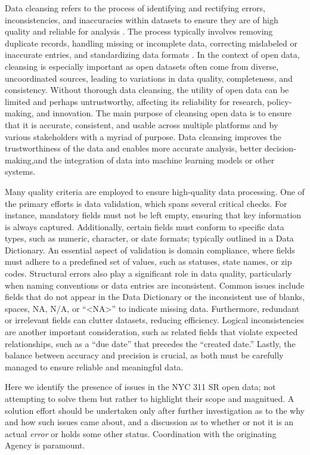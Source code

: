 \documentclass[linenumber]{jdsart}
\begin{document}
Data cleansing refers to the process of identifying and rectifying
errors, inconsistencies, and inaccuracies within datasets to ensure
they are of high quality and reliable for analysis
\citep{maletic2005data, hosseinzadeh2023data}. The process
typically involves removing duplicate records, handling missing or
incomplete data, correcting mislabeled or inaccurate entries, and
standardizing data formats \citep[e.g.,][]{cody2017cody,
  van2018statistical}. In the context of open data, cleansing is
especially important as open datasets often come from diverse,
uncoordinated sources, leading to variations in data quality,
completeness, and consistency. Without thorough data cleansing, the utility
of open data can be limited and perhaps untrustworthy, affecting 
its reliability for research, policy-making, and innovation. The 
main purpose of cleansing open data is to ensure that it is 
accurate, consistent, and usable across multiple platforms and by 
various stakeholders with a myriad of purpose. Data cleansing improves
the trustworthiness of the data and enables more accurate analysis, 
better decision-making,and the integration of data into machine
learning models or other systems.


Many quality criteria are employed to ensure high-quality data 
processing. One of the primary efforts is data validation, which spans 
several critical checks. For instance, mandatory fields must not be 
left empty, ensuring that key information is always captured. 
Additionally, certain fields must conform to specific data types, 
such as numeric, character, or date formats; typically 
outlined in a Data Dictionary. An essential aspect of validation 
is domain compliance, where fields must adhere to a predefined set of 
values, such as statuses, state names, or zip codes. Structural 
errors also play a significant role in data quality, particularly when 
naming conventions or data entries are inconsistent. Common issues 
include fields that do not appear in the Data Dictionary or the 
inconsistent use of blanks, spaces, NA, N/A, or ``<NA>'' to indicate 
missing data. Furthermore, redundant or irrelevant fields can clutter 
datasets, reducing efficiency. Logical inconsistencies are another 
important consideration, such as related fields that violate expected 
relationships, such as a ``due date'' that precedes the ``created date.'' 
Lastly, the balance between accuracy and precision is crucial, as both 
must be carefully managed to ensure reliable and meaningful data.


Here we identify the presence of issues in the NYC 311 SR open data;
not attempting to solve them but rather to highlight their scope and
magnitued. A solution effort should be undertaken only after further 
investigation as to the why and how such issues came about, 
and a discussion as to whether or not it is an actual \textit{error} or 
holds some other status. Coordination with the originating Agency
is paramount.
\end{document}

